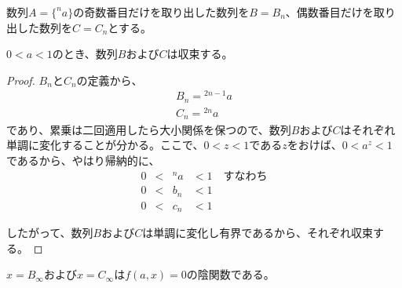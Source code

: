 	\begin{lemma}
		数列$A = \{^n a\}$の奇数番目だけを取り出した数列を$B = {B_n}$、偶数番目だけを取り出した数列を$C = {C_n}$とする。
		
		$0 < a < 1$のとき、数列$B$および$C$は収束する。
	\end{lemma}
	\begin{proof}
	
		$B_n$と$C_n$の定義から、
		\begin{align*}
			B_n = {^{2n-1} a} \\
			C_n = {^{2n} a}
		\end{align*}
		であり、累乗は二回適用したら大小関係を保つので、数列$B$および$C$はそれぞれ単調に変化することが分かる。ここで、$0 < z < 1$である$z$をおけば、$0 < a^z < 1$であるから、やはり帰納的に、
		\begin{align*}
			0 &<& {^n a} &< 1 \quad \text{すなわち} \\
			0 &<& b_n    &< 1 \\
			0 &<& c_n    &< 1
		\end{align*}
		
		したがって、数列$B$および$C$は単調に変化し有界であるから、それぞれ収束する。
	\end{proof}

	\begin{theorem}
	\label{th:tetration_implicit_function}
		$x = B_{\infty}$および$x = C_{\infty}$は$f(a,x)=0$の陰関数である。
	\end{theorem}
	
